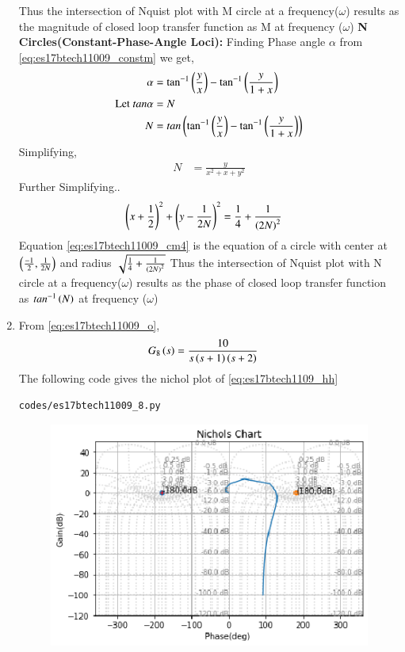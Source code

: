 \begin{enumerate}[label=\thesection.\arabic*.,ref=\thesection.\theenumi]
Thus the intersection of Nquist plot with M circle at a frequency($\omega$) results as the magnitude of closed loop transfer function as M at frequency ($\omega$)
\textbf{N Circles(Constant-Phase-Angle Loci):}
Finding Phase angle $\alpha$ from \eqref{eq:es17btech11009_constm} we get,
\begin{align}
\alpha &= \tan^{-1}\left(\frac{y}{x}\right)-\tan^{-1}\left(\frac{y}{1+x}\right)
\\
\text{Let } tan\alpha &= N
\\
N &= tan\left(\tan^{-1}\left(\frac{y}{x}\right)-\tan^{-1}\left(\frac{y}{1+x}\right)\right)
\end{align}
Simplifying,
\begin{align}
N &= \frac{y}{x^{2}+x+y^{2}}
\end{align}
Further Simplifying..
\begin{align}
\brak{x+\frac{1}{2}}^{2}+\brak{y-\frac{1}{2N}}^{2} &= \frac{1}{4}+\frac{1}{\brak{2N}^{2}}
\label{eq:es17btech11009_cm4}
\end{align}
Equation \eqref{eq:es17btech11009_cm4} is the equation of a circle with center at $\left(\frac{-1}{2},\frac{1}{2N}\right)$ and radius $\sqrt{\frac{1}{4}+\frac{1}{\left(2N\right)^{2}}}$
Thus the intersection of Nquist plot with N circle at a frequency($\omega$) results as the phase of closed loop transfer function as $tan^{-1}\left(N\right)$ at frequency ($\omega$)
\item
From \eqref{eq:es17btech11009_o},
\begin{align}
G_8\brak{s} &=\frac{10}{s\brak{s+1}\brak{s+2}}
\label{eq:es17btech1109_hh}
\end{align}
\solution 
The following code gives the nichol plot of \eqref{eq:es17btech1109_hh} 
\begin{lstlisting}
codes/es17btech11009_8.py
\end{lstlisting}
\begin{figure}[!h]
\includegraphics[width=\columnwidth]{./figs/es17btech11009_8.eps}

\end{figure}
\end{enumerate}
